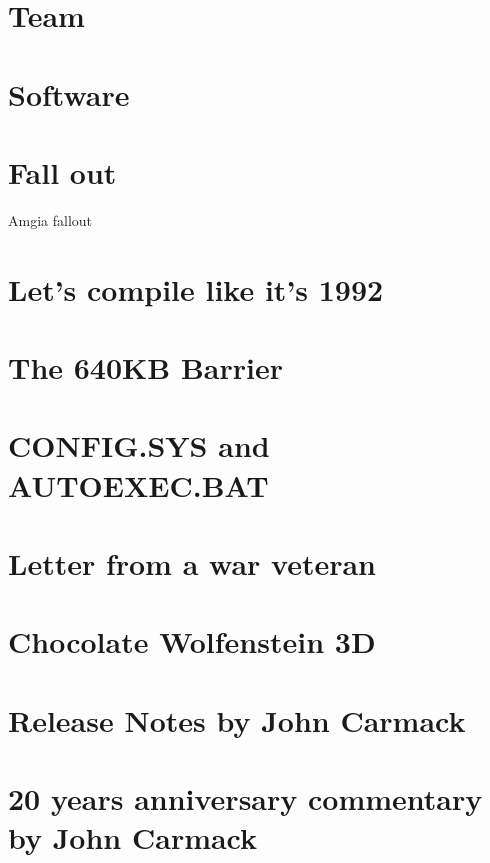 \documentclass[12pt]{book}
\begin{document}
    \chapter{Team}
      
    \chapter{Software}
       
    \chapter{Fall out}
        

        Amgia fallout

    \appendix
    \appendixpage

    \chapter{Let's compile like it's 1992}
    \chapter{The 640KB Barrier}\label{chap:barrier640}
    \chapter{CONFIG.SYS and AUTOEXEC.BAT}
    \chapter{Letter from a war veteran}
    \chapter{Chocolate Wolfenstein 3D}
    \chapter{Release Notes by John Carmack}
    \chapter{20 years anniversary commentary by John Carmack}
\end{document}
